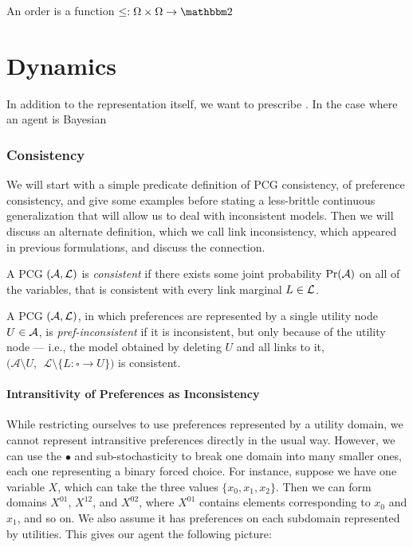 \documentclass{article}
\begin{document}
	
	An order is a function $\leq: \Omega \times \Omega \to \mathbbm 2$
	
	\part{Dynamics}
	In addition to the representation itself, we want to prescribe . 
	In the case where an agent is Bayesian 
	
	\section{Consistency}
	\label{sec:inconsistency-ex}
	We will start with a simple predicate definition of PCG consistency, of preference consistency, and give some examples before stating a less-brittle continuous generalization that will allow us to deal with inconsistent models. Then we will discuss an alternate definition, which we call link inconsistency, which appeared in previous formulations, and discuss the connection.

	
	\begin{defn}[consistency]
		A PCG $(\cal A, L)$ is \emph{consistent} if there exists some joint probability $\Pr(\cal A)$ on all of the variables, that is consistent with every link marginal $L \in \cal L$.
	\end{defn}


	\begin{defn}
		A PCG $(\cal A, L)$, in which preferences are represented by a single utility node $U \in \cal A$, is \textit{pref-inconsistent} if it is inconsistent, but only because of the utility node --- i.e., the model obtained by deleting $U$ and all links to it, $\big(\mathcal A \setminus U,~~\mathcal L \setminus \{ L : \square\to U \}\big)$ is consistent.
	\end{defn}
	
	\subsection{Intransitivity of Preferences as Inconsistency}
	

	
	While restricting ourselves to use preferences represented by a utility domain, we cannot represent intransitive preferences directly in the usual way. However, we can use the $\bullet$ and sub-stochasticity to break one domain into many smaller ones, each one representing a binary forced choice. For instance, suppose we have one variable $X$, which can take the three values $\{x_0, x_1, x_2\}$. Then we can form domains $X^{01}$, $X^{12}$, and $X^{02}$, where $X^{01}$ contains elements corresponding to $x_0$ and $x_1$, and so on. We also assume it has preferences on each subdomain represented by utilities. This gives our agent the following picture:
	
\end{document}
